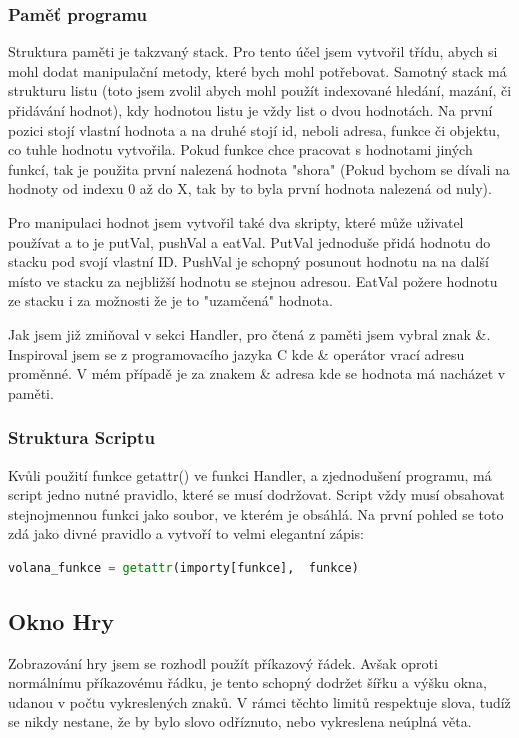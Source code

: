 \documentclass[12pt,a4paper]{article}
\begin{document}
\subsubsection{Paměť programu}
Struktura paměti je takzvaný stack. Pro tento účel jsem vytvořil třídu, abych si mohl dodat manipulační metody, které bych mohl potřebovat. Samotný stack má strukturu listu (toto jsem zvolil abych mohl použít indexované hledání, mazání, či přidávání hodnot), kdy hodnotou listu je vždy list o dvou hodnotách. Na první pozici stojí vlastní hodnota a na druhé stojí id, neboli adresa, funkce či objektu, co tuhle hodnotu vytvořila. Pokud funkce chce pracovat s hodnotami jiných funkcí, tak je použita první nalezená hodnota "shora" (Pokud bychom se dívali na hodnoty od indexu 0 až do X, tak by to byla první hodnota nalezená od nuly).

Pro manipulaci hodnot jsem vytvořil také dva skripty, které může uživatel používat a to je putVal, pushVal a eatVal. PutVal jednoduše přidá hodnotu do stacku pod svojí vlastní ID. PushVal je schopný posunout hodnotu na na další místo ve stacku za nejbližší hodnotu se stejnou adresou. EatVal požere hodnotu ze stacku i za možnosti že je to "uzamčená" hodnota.

Jak jsem již zmiňoval v sekci Handler, pro čtená z paměti jsem vybral znak \&. Inspiroval jsem se z programovacího jazyka C kde \& operátor vrací adresu proměnné. V mém případě je za znakem \& adresa kde se hodnota má nacházet v paměti.
\subsubsection{Struktura Scriptu}
Kvůli použití funkce getattr() ve funkci Handler, a zjednodušení programu, má script jedno nutné
pravidlo, které se musí dodržovat. Script vždy musí obsahovat stejnojmennou funkci jako soubor, ve kterém je obsáhlá. Na první pohled se toto zdá jako divné pravidlo a vytvoří to velmi elegantní zápis: 
\begin{lstlisting}[language=Python] 
volana_funkce = getattr(importy[funkce],  funkce) 
\end{lstlisting}
\subsection{Okno Hry}
Zobrazování hry jsem se rozhodl použít příkazový řádek. Avšak oproti normálnímu příkazovému řádku, je tento schopný dodržet šířku a výšku okna, udanou v počtu vykreslených znaků. V rámci těchto limitů respektuje slova, tudíž se nikdy nestane, že by bylo slovo odříznuto, nebo vykreslena neúplná věta.
\end{document}
